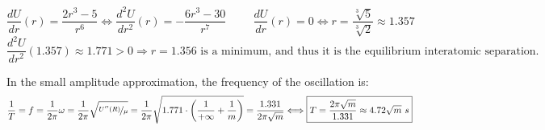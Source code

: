 \documentclass{report}
\begin{document}
  \[\dfrac{dU}{dr}(r)=\dfrac{2r^3-5}{r^6}\Longleftrightarrow\dfrac{d^2U}{dr^2}(r)=-\dfrac{6r^3-30}{r^7}\hspace{1cm}\dfrac{dU}{dr}(r)=0\Longleftrightarrow r=\dfrac{\sqrt[3]{5}}{\sqrt[3]{2}}\approx 1.357\]
  \[\dfrac{d^2U}{dr^2}(1.357)\approx1.771>0\Longrightarrow r=1.356\text{ is a minimum, and thus it is the equilibrium interatomic separation.}\]

  \vspace{0.4cm}
  \noindent In the small amplitude approximation, the frequency of the oscillation is: 
  \[\dfrac{1}{T}=f=\dfrac{1}{2\pi}\omega=\dfrac{1}{2\pi}\sqrt{\nicefrac{U^{\prime\prime}(R)}{\mu}}=\dfrac{1}{2\pi}\sqrt{1.771\cdot\left(\dfrac{1}{+\infty}+\dfrac{1}{m}\right)}=\dfrac{1.331}{2\pi\sqrt{m}}\Longleftrightarrow \boxed{T=\dfrac{2\pi\sqrt{m}}{1.331}\approx 4.72\sqrt{m}\ s}\]
\end{document}
